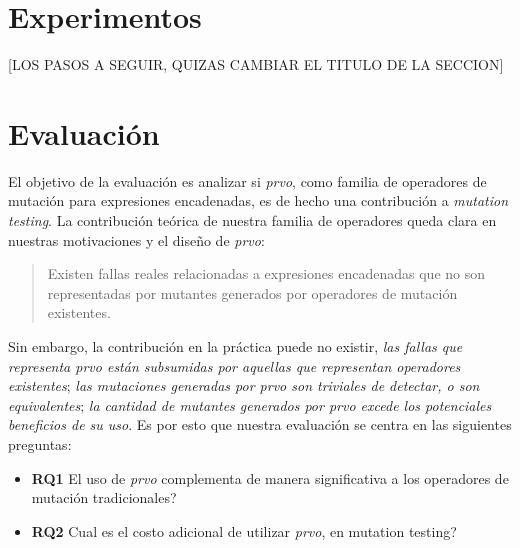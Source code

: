 \section{Experimentos}
\label{sec:evaluation.steps}

[LOS PASOS A SEGUIR, QUIZAS CAMBIAR EL TITULO DE LA SECCION]

\section{Evaluaci\'on}
\label{sec:evaluation.evaluation}

El objetivo de la evaluaci\'on es analizar si \emph{prvo}, como familia de operadores de mutaci\'on para expresiones encadenadas, es de hecho una contribuci\'on a \emph{mutation testing}. La contribuci\'on te\'orica de nuestra familia de operadores queda clara en nuestras motivaciones y el dise\~no de \emph{prvo}:
\begin{quote}
  Existen fallas reales relacionadas a expresiones encadenadas que no son representadas por mutantes generados por operadores de mutaci\'on existentes.
\end{quote}
Sin embargo, la contribuci\'on en la pr\'actica puede no existir, \emph{las fallas que representa prvo est\'an subsumidas por aquellas que representan operadores existentes}; \emph{las mutaciones generadas por prvo son triviales de detectar, o son equivalentes}; \emph{la cantidad de mutantes generados por prvo excede los potenciales beneficios de su uso}. Es por esto que nuestra evaluaci\'on se centra en las siguientes preguntas:
\begin{itemize}
	\item \textbf{RQ1} El uso de \emph{prvo} complementa de manera significativa a los operadores de mutaci\'on tradicionales?
	
	\item \textbf{RQ2} Cual es el costo adicional de utilizar \emph{prvo}, en mutation testing?
\end{itemize}

